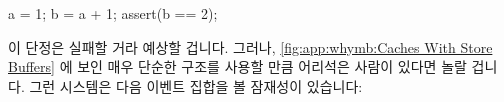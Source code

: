\fi

\begin{VerbatimN}[fontsize=\footnotesize,samepage=true]
a = 1;
b = a + 1;
assert(b == 2);
\end{VerbatimN}

이 단정은 실패할 거라 예상할 겁니다.
그러나,
\cref{fig:app:whymb:Caches With Store Buffers} 에 보인 매우 단순한 구조를
사용할 만큼 어리석은 사람이 있다면 놀랄 겁니다.
그런 시스템은 다음 이벤트 집합을 볼 잠재성이 있습니다:

\iffalse

One would not expect the assertion to fail.
However, if one were foolish enough to use the very simple architecture
shown in
\cref{fig:app:whymb:Caches With Store Buffers},
one would be surprised.
Such a system could potentially see the following sequence of events:

\fi

